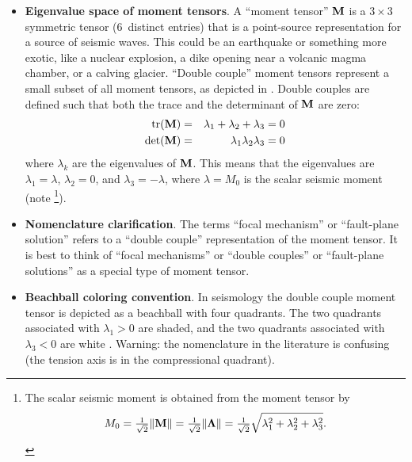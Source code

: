 \documentclass[11pt,titlepage,fleqn]{article}
\begin{document}
\begin{spacing}{1.0}
\begin{itemize}
\item {\bf Eigenvalue space of moment tensors}. A ``moment tensor'' $\mbox{${\bf M}$}$ is a $3 \times 3$ symmetric tensor (6~distinct entries) that is a point-source representation for a source of seismic waves. This could be an earthquake or something more exotic, like a nuclear explosion, a dike opening near a volcanic magma chamber, or a calving glacier. ``Double couple'' moment tensors represent a small subset of all moment tensors, as depicted in . Double couples are defined such that both the trace and the determinant of $\mbox{${\bf M}$}$ are zero:
%
\begin{eqnarray*}
{\rm tr}(\mbox{${\bf M}$}) &=& \lambda_1 + \lambda_2 + \lambda_3 = 0
\\
\det(\mbox{${\bf M}$}) &=& \lambda_1 \lambda_2 \lambda_3 = 0
\end{eqnarray*}
%
where $\lambda_k$ are the eigenvalues of $\mbox{${\bf M}$}$. This means that the eigenvalues are $\lambda_1 = \lambda$, $\lambda_2 = 0$, and $\lambda_3 = -\lambda$, where $\lambda = M_0$ is the scalar seismic moment (note \footnote{The scalar seismic moment is obtained from the moment tensor by
%
\begin{equation}
M_0 = \sfrac{1}{\sqrt{2}} \| \bM \|
= \sfrac{1}{\sqrt{2}} \| \bLambda \|
= \sfrac{1}{\sqrt{2}} \sqrt{\lambda_1^2 + \lambda_2^2 + \lambda_3^2}.
\end{equation}
}).

\item {\bf Nomenclature clarification}. 
The terms ``focal mechanism'' or ``fault-plane solution'' refers to a ``double couple'' representation of the moment tensor. It is best to think of ``focal mechanisms'' or ``double couples'' or ``fault-plane solutions'' as a special type of moment tensor.

\item {\bf Beachball coloring convention}. 
In seismology the double couple moment tensor is depicted as a beachball with four quadrants. The two quadrants associated with \mbox{$\lambda_1 > 0$} are shaded, and the two quadrants associated with \mbox{$\lambda_3 < 0$} are white \citep[][p.~257]{ShearerE2} \citep[][p.~224]{SteinWysession}. Warning: the nomenclature in the literature is confusing (\eg the tension axis is in the compressional quadrant).

\end{itemize}

\end{spacing}

\end{document}

